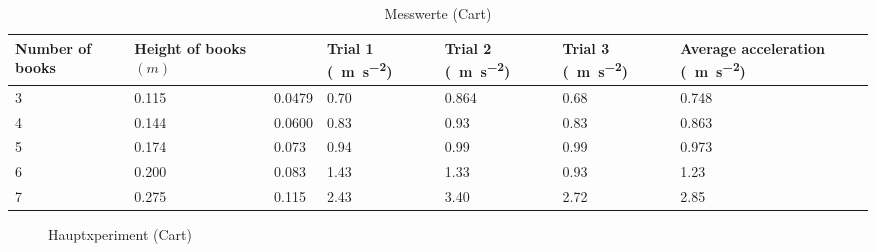 \documentclass[a4paper, titlepage]{article}
\newcommand{\accunit}[1]{\SI{#1}{\metre\per\square\second}}
\begin{document}
    
    \begin{table}
        \begin{tabularx}{\textwidth}{|X|X|X|X|X|X|X|}
            \hline
            \textbf{Number of books} & \textbf{Height of books $(m)$} & 
            \boldmath{$\sin{\theta}$} & \textbf{Trial 1}
            (\accunit{}) & 
            \textbf{Trial 2} (\accunit{}) & 
            \textbf{Trial 3} (\accunit{}) & 
            \textbf{Average acceleration} (\accunit{}) \\
            \hline
            3 & 0.115 & 0.0479 & 0.70 & 0.864 & 0.68 & 0.748 \\
            \hline
            4 & 0.144 & 0.0600 & 0.83 & 0.93 & 0.83 & 0.863 \\
            \hline
            5 & 0.174 & 0.073 & 0.94 & 0.99 & 0.99 & 0.973 \\
            \hline
            6 & 0.200 & 0.083 & 1.43 & 1.33 & 0.93 & 1.23 \\
            \hline
            7 & 0.275 & 0.115 & 2.43 & 3.40 & 2.72 & 2.85 \\
            \hline
        \end{tabularx}
        \caption{Messwerte (Cart)}
        \label{cart}
    \end{table}
    
    \begin{figure}
        \centering
        \qquad
        \caption{Hauptxperiment (Cart)}
        \label{main_experiment_cart}
    \end{figure}

    \nocite{*}
    
    
\end{document}
